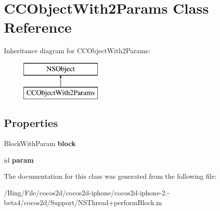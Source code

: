\hypertarget{interface_c_c_object_with2_params}{\section{C\-C\-Object\-With2\-Params Class Reference}
\label{interface_c_c_object_with2_params}
}
Inheritance diagram for C\-C\-Object\-With2\-Params\-:\begin{figure}[H]
\begin{center}
\leavevmode
\includegraphics[height=2.000000cm]{interface_c_c_object_with2_params}
\end{center}
\end{figure}
\subsection*{Properties}
\begin{DoxyCompactItemize}
\item 
\hypertarget{interface_c_c_object_with2_params_aab6f8a419d4b79ac20a636655cff9026}{Block\-With\-Param {\bfseries block}}\label{interface_c_c_object_with2_params_aab6f8a419d4b79ac20a636655cff9026}

\item 
\hypertarget{interface_c_c_object_with2_params_a4bf7b8c37e4d264ad429117a0e2d223b}{id {\bfseries param}}\label{interface_c_c_object_with2_params_a4bf7b8c37e4d264ad429117a0e2d223b}

\end{DoxyCompactItemize}


The documentation for this class was generated from the following file\-:\begin{DoxyCompactItemize}
\item 
/\-Bing/\-File/cocos2d/cocos2d-\/iphone/cocos2d-\/iphone-\/2.-\/beta4/cocos2d/\-Support/N\-S\-Thread+perform\-Block.\-m\end{DoxyCompactItemize}
